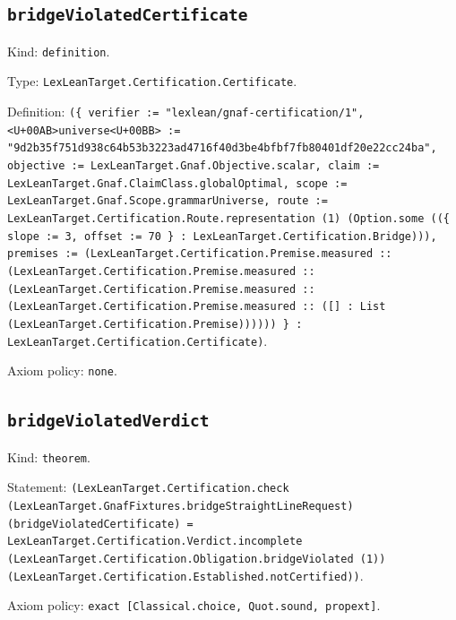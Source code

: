 \documentclass[11pt]{article}
\begin{document}
\subsection*{\texttt{bridgeViolatedCertificate}}
\noindent Kind: \texttt{definition}.\par
\noindent Type: \texttt{LexLeanTarget.Certification.Certificate}.\par
\noindent Definition: \texttt{(\{ verifier := "lexlean/gnaf-certification/1", <U+00AB>universe<U+00BB> := "9d2b35f751d938c64b53b3223ad4716f40d3be4bfbf7fb80401df20e22cc24ba", objective := LexLeanTarget.Gnaf.Objective.scalar, claim := LexLeanTarget.Gnaf.ClaimClass.globalOptimal, scope := LexLeanTarget.Gnaf.Scope.grammarUniverse, route := LexLeanTarget.Certification.Route.representation (1) (Option.some ((\{ slope := 3, offset := 70 \} : LexLeanTarget.Certification.Bridge))), premises := (LexLeanTarget.Certification.Premise.measured :: (LexLeanTarget.Certification.Premise.measured :: (LexLeanTarget.Certification.Premise.measured :: (LexLeanTarget.Certification.Premise.measured :: ([] : List (LexLeanTarget.Certification.Premise)))))) \} : LexLeanTarget.Certification.Certificate)}.\par
\noindent Axiom policy: \texttt{none}.\par
\subsection*{\texttt{bridgeViolatedVerdict}}
\noindent Kind: \texttt{theorem}.\par
\noindent Statement: \texttt{(LexLeanTarget.Certification.check (LexLeanTarget.GnafFixtures.bridgeStraightLineRequest) (bridgeViolatedCertificate) = LexLeanTarget.Certification.Verdict.incomplete (LexLeanTarget.Certification.Obligation.bridgeViolated (1)) (LexLeanTarget.Certification.Established.notCertified))}.\par
\noindent Axiom policy: \texttt{exact [Classical.choice, Quot.sound, propext]}.\par
\end{document}
